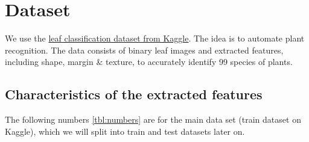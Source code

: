 \documentclass{sig-alternate-05-2015}
\begin{document}
%
\author{
%
%
\alignauthor
Stefan Beyer\\
       \\
\alignauthor
Georg Heiler\\
       \\
}
\date{30 July 1999}

\maketitle

\section{Dataset}
We use the \href{https://www.kaggle.com/c/leaf-classification}{leaf classification dataset from Kaggle}. The idea is to automate plant recognition. The data consists of binary leaf images and extracted features, including shape, margin \& texture, to accurately identify 99 species of plants.

\subsection{Characteristics of the extracted features}
The following numbers \ref{tbl:numbers} are for the main data set (train dataset on Kaggle), which we will split into train and test datasets later on.
\end{document}
